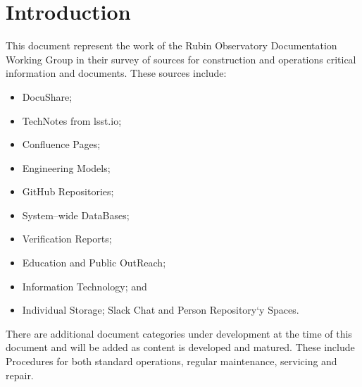 
\section {Introduction}

This document represent the work of the Rubin Observatory Documentation Working Group in their survey of sources for construction and operations critical information and documents.  These sources include:

\begin{itemize}
	\item DocuShare;
	\item TechNotes from lsst.io;
	\item Confluence Pages;
	\item Engineering Models; 
	\item GitHub Repositories;
	\item System--wide DataBases;
	\item Verification Reports;
	\item Education and Public OutReach; 
	\item Information Technology; and
	\item Individual Storage; Slack Chat and Person Repository`y Spaces.
\end{itemize}
	
There are additional document categories under development at the time of this document and will be added as content is developed and matured.  These include Procedures for both standard operations, regular maintenance, servicing and repair.